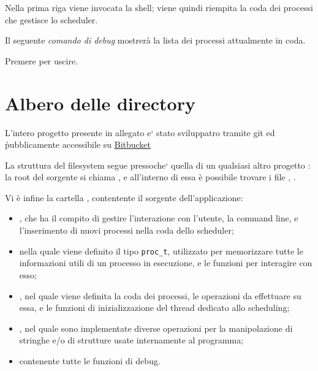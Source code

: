 \documentclass[11pt]{article}
\begin{document}
\noindent Nella prima riga viene invocata la shell; viene quindi riempita la
coda dei processi che gestisce lo scheduler.
\\ 

\noindent Il seguente \emph{comando di debug} mostrer\`a la lista dei processi
attualmente in coda.
\\ 

\noindent Premere  per uscire.

\section{Albero delle directory}

L'intero progetto presente in allegato e` stato sviluppatro tramite git ed
\`pubblicamente accessibile su
\href{https://bitbucket.org/maker/shellder/}{Bitbucket}

La struttura del filesystem segue pressoche` quella di un qualsiasi altro progetto :
la root del sorgente si chiama , e all'interno di essa \`e possibile trovare i
file , .

Vi \`e infine la cartella , contentente il sorgente dell'applicazione:
\begin{itemize}
\item {}, che ha il compito di gestire l'interazione con l'utente, la command line,
       e l'inserimento di nuovi processi nella coda dello scheduler;

\item {} nella quale viene definito il tipo \texttt{proc\_t}, utilizzato per memorizzare
	   tutte le informazioni utili di un processo in esecuzione, e le funzioni per interagire con esso;

\item {}, nel quale viene definita la coda dei processi, le operazioni da
       effettuare su essa, e le funzioni di inizializzazione del thread dedicato allo scheduling;

\item {}, nel quale sono implementate diverse operazioni per la manipolazione di
       stringhe e/o di strutture usate internamente al programma;

\item {} contenente tutte le funzioni di debug.
\end{itemize}
\end{document}
